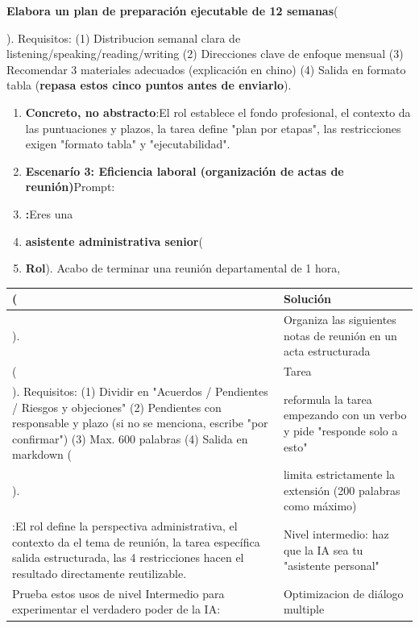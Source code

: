 \textbf{Elabora un plan de preparación ejecutable de 12 semanas}(


). Requisitos: (1) Distribucion semanal clara de listening/speaking/reading/writing (2) Direcciones clave de enfoque mensual (3) Recomendar 3 materiales adecuados (explicación en chino) (4) Salida en formato tabla (\textbf{repasa estos cinco puntos antes de enviarlo}).

\begin{enumerate}
  \item \textbf{Concreto, no abstracto}:El rol establece el fondo profesional, el contexto da las puntuaciones y plazos, la tarea define "plan por etapas", las restricciones exigen "formato tabla" y "ejecutabilidad".
  \item \textbf{Escenarío 3: Eficiencia laboral (organización de actas de reunión)}Prompt:
  \item \textbf{:}Eres una
  \item \textbf{asistente administrativa senior}(
  \item \textbf{Rol}). Acabo de terminar una reunión departamental de 1 hora,
\end{enumerate}


\begin{center}
\begin{tabularx}{\linewidth}{|X|X|}
\hline
\textbf{(} & \textbf{Solución} \tabularnewline
\hline
). & Organiza las siguientes notas de reunión en un acta estructurada \tabularnewline
( & Tarea \tabularnewline
). Requisitos: (1) Dividir en "Acuerdos / Pendientes / Riesgos y objeciones" (2) Pendientes con responsable y plazo (si no se menciona, escribe "por confirmar") (3) Max. 600 palabras (4) Salida en markdown ( & reformula la tarea empezando con un verbo y pide "responde solo a esto" \tabularnewline
). & limita estrictamente la extensión (200 palabras como máximo) \tabularnewline
:El rol define la perspectiva administrativa, el contexto da el tema de reunión, la tarea específica salida estructurada, las 4 restricciones hacen el resultado directamente reutilizable. & Nivel intermedio: haz que la IA sea tu "asistente personal" \tabularnewline
Prueba estos usos de nivel Intermedio para experimentar el verdadero poder de la IA: & Optimizacion de diálogo multiple \tabularnewline
\hline
\end{tabularx}
\end{center}

